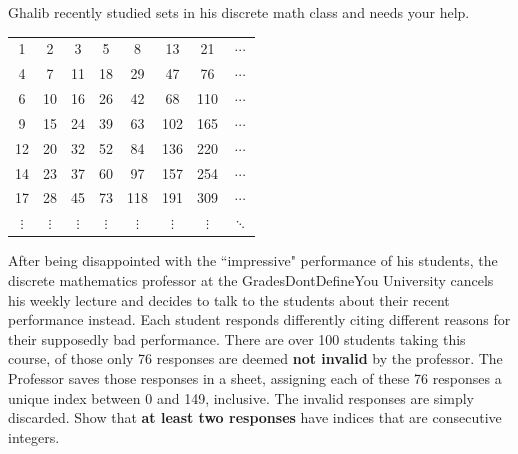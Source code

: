 \documentclass[addpoints]{exam}
\begin{document}
\begin{questions}
	Ghalib recently studied sets in his discrete math class and needs your help.
	
	\begin{center}
		\begin{tabular}{c c c c c c c c}
			\cellcolor{blue!25}1 & 2 & 3 & 5 & 8 & 13 & 21 & $\cdots$\\
			4 & \cellcolor{blue!25}7 & 11 & 18 & 29 & 47 & 76 & $\cdots$\\
			6 & 10 & \cellcolor{blue!25}16 & 26 & 42 & 68 & 110 & $\cdots$\\
			9 & 15 & 24 & \cellcolor{blue!25}39 & 63 & 102 & 165 & $\cdots$ \\
			12 & 20 & 32 & 52 & \cellcolor{blue!25}84 & 136 & 220 & $\cdots$ \\
			14 & 23 & 37 & 60 & 97 & \cellcolor{blue!25}157 & 254 & $\cdots$\\
			17 & 28 & 45 & 73 & 118 & 191 & \cellcolor{blue!25}309 & $\cdots$\\
			$\vdots$ & $\vdots$ & $\vdots$ & $\vdots$ & $\vdots$ & $\vdots$ & $\vdots$ & \color{blue}$\ddots$\\
		\end{tabular}
	\end{center}
	
	\question After being disappointed with the ``impressive" performance of his students, the discrete mathematics professor at the GradesDontDefineYou University
	cancels his weekly lecture and decides to talk to the students about their recent performance instead. Each student responds differently
	citing different reasons for their supposedly bad performance. 
	There are over 100 students taking this course, of those only 76 responses are deemed \textbf{not invalid} by the professor.
	The Professor saves those responses in a sheet, assigning each of these 76 responses a unique index between 0 and 149,
	inclusive. The invalid responses are simply discarded. Show that \textbf{at least two responses} have indices that are consecutive integers.
\end{questions}
\end{document}
